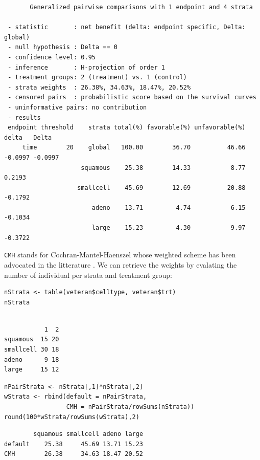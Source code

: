 \documentclass[12pt]{article}
\begin{document}
\begin{verbatim}
       Generalized pairwise comparisons with 1 endpoint and 4 strata

 - statistic       : net benefit (delta: endpoint specific, Delta: global) 
 - null hypothesis : Delta == 0 
 - confidence level: 0.95 
 - inference       : H-projection of order 1
 - treatment groups: 2 (treatment) vs. 1 (control) 
 - strata weights  : 26.38%, 34.63%, 18.47%, 20.52% 
 - censored pairs  : probabilistic score based on the survival curves
 - uninformative pairs: no contribution
 - results
 endpoint threshold    strata total(%) favorable(%) unfavorable(%)   delta   Delta
     time        20    global   100.00        36.70          46.66 -0.0997 -0.0997
                     squamous    25.38        14.33           8.77  0.2193        
                    smallcell    45.69        12.69          20.88 -0.1792        
                        adeno    13.71         4.74           6.15 -0.1034        
                        large    15.23         4.30           9.97 -0.3722
\end{verbatim}

\texttt{CMH} stands for Cochran-Mantel-Haenszel whose weighted scheme has
been advocated in the litterature \citep{dong2018stratified}. We can
retrieve the weights by evalating the number of individual per strata
and treatment group:
\lstset{language=r,label= ,caption= ,captionpos=b,numbers=none}
\begin{lstlisting}
nStrata <- table(veteran$celltype, veteran$trt)
nStrata
\end{lstlisting}

\begin{verbatim}

           1  2
squamous  15 20
smallcell 30 18
adeno      9 18
large     15 12
\end{verbatim}


\lstset{language=r,label= ,caption= ,captionpos=b,numbers=none}
\begin{lstlisting}
nPairStrata <- nStrata[,1]*nStrata[,2]
wStrata <- rbind(default = nPairStrata,
                 CMH = nPairStrata/rowSums(nStrata)) 
round(100*wStrata/rowSums(wStrata),2)
\end{lstlisting}

\begin{verbatim}
        squamous smallcell adeno large
default    25.38     45.69 13.71 15.23
CMH        26.38     34.63 18.47 20.52
\end{verbatim}
\end{document}
